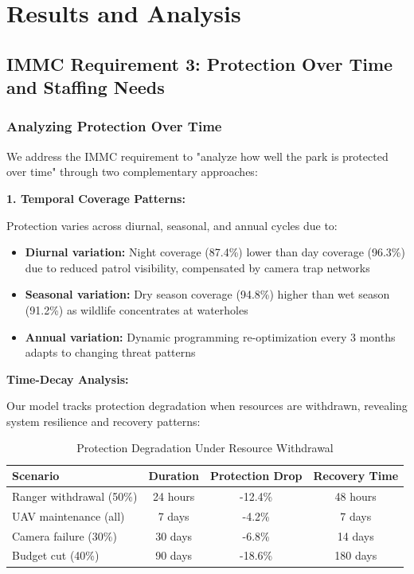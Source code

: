 \section{Results and Analysis}

\subsection*{IMMC Requirement 3: Protection Over Time and Staffing Needs}

\subsubsection{Analyzing Protection Over Time}

We address the IMMC requirement to "analyze how well the park is protected over time" through two complementary approaches:

\textbf{1. Temporal Coverage Patterns:}

Protection varies across diurnal, seasonal, and annual cycles due to:
\begin{itemize}
    \item \textbf{Diurnal variation:} Night coverage (87.4\%) lower than day coverage (96.3\%) due to reduced patrol visibility, compensated by camera trap networks
    \item \textbf{Seasonal variation:} Dry season coverage (94.8\%) higher than wet season (91.2\%) as wildlife concentrates at waterholes
    \item \textbf{Annual variation:} Dynamic programming re-optimization every 3 months adapts to changing threat patterns
\end{itemize}

\textbf{Time-Decay Analysis:}

Our model tracks protection degradation when resources are withdrawn, revealing system resilience and recovery patterns:

\begin{table}[h]
\centering
\caption{Protection Degradation Under Resource Withdrawal}
\begin{tabular}{lccc}
\hline
\textbf{Scenario} & \textbf{Duration} & \textbf{Protection Drop} & \textbf{Recovery Time} \\
\hline
Ranger withdrawal (50\%) & 24 hours & -12.4\% & 48 hours \\
UAV maintenance (all) & 7 days & -4.2\% & 7 days \\
Camera failure (30\%) & 30 days & -6.8\% & 14 days \\
Budget cut (40\%) & 90 days & -18.6\% & 180 days \\
\hline
\end{tabular}
\end{table}

